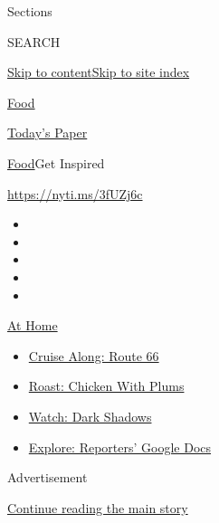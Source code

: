 Sections

SEARCH

\protect\hyperlink{site-content}{Skip to
content}\protect\hyperlink{site-index}{Skip to site index}

\href{https://www.nytimes3xbfgragh.onion/section/food}{Food}

\href{https://myaccount.nytimes3xbfgragh.onion/auth/login?response_type=cookie\&client_id=vi}{}

\href{https://www.nytimes3xbfgragh.onion/section/todayspaper}{Today's
Paper}

\href{/section/food}{Food}\textbar{}Get Inspired

\url{https://nyti.ms/3fUZj6c}

\begin{itemize}
\item
\item
\item
\item
\item
\end{itemize}

\href{https://www.nytimes3xbfgragh.onion/spotlight/at-home?action=click\&pgtype=Article\&state=default\&region=TOP_BANNER\&context=at_home_menu}{At
Home}

\begin{itemize}
\tightlist
\item
  \href{https://www.nytimes3xbfgragh.onion/2020/09/07/travel/route-66.html?action=click\&pgtype=Article\&state=default\&region=TOP_BANNER\&context=at_home_menu}{Cruise
  Along: Route 66}
\item
  \href{https://www.nytimes3xbfgragh.onion/2020/09/04/dining/sheet-pan-chicken.html?action=click\&pgtype=Article\&state=default\&region=TOP_BANNER\&context=at_home_menu}{Roast:
  Chicken With Plums}
\item
  \href{https://www.nytimes3xbfgragh.onion/2020/09/04/arts/television/dark-shadows-stream.html?action=click\&pgtype=Article\&state=default\&region=TOP_BANNER\&context=at_home_menu}{Watch:
  Dark Shadows}
\item
  \href{https://www.nytimes3xbfgragh.onion/interactive/2020/at-home/even-more-reporters-editors-diaries-lists-recommendations.html?action=click\&pgtype=Article\&state=default\&region=TOP_BANNER\&context=at_home_menu}{Explore:
  Reporters' Google Docs}
\end{itemize}

Advertisement

\protect\hyperlink{after-top}{Continue reading the main story}

